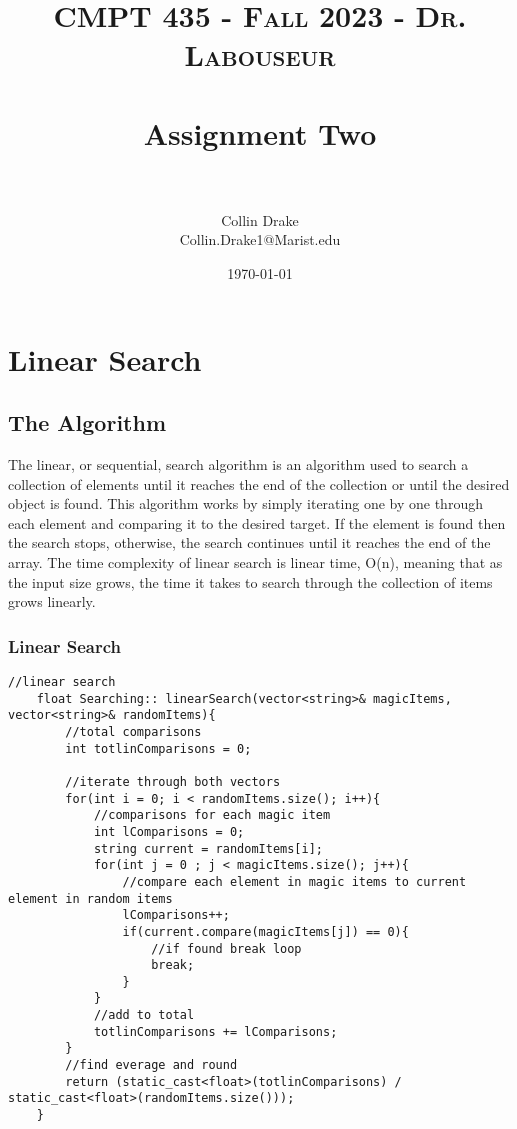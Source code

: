 \documentclass[letterpaper, 10pt,DIV=13]{scrartcl}
\title{	
   \normalfont \normalsize 
   \textsc{CMPT 435 - Fall 2023 - Dr. Labouseur} \\[10pt] %
   \horrule{0.5pt} \\[0.25cm] 	%
   \huge Assignment Two  \\     	    %
   \horrule{0.5pt} \\[0.25cm] 	%
}
\author{Collin Drake \\ \normalsize Collin.Drake1@Marist.edu}
\date{\normalsize\today} 	%
\numberwithin{equation}{section} %
\numberwithin{figure}{section} %
\numberwithin{table}{section} %
\begin{document}
\maketitle %

\section{Linear Search}

\subsection{The Algorithm}
The linear, or sequential, search algorithm is an algorithm used to search a collection of elements until it reaches the end of the collection or until the desired object is found. This algorithm works by simply iterating one by one through each element and comparing it to the desired target. If the element is found then the search stops, otherwise, the search continues until it reaches the end of the array. The time complexity of linear search is linear time, O(n), meaning that as the input size grows, the time it takes to search through the collection of items grows linearly.

\subsubsection*{Linear Search}
    \lstset{numbers=left, numberstyle=\tiny, stepnumber=1, numbersep=5pt, basicstyle=\footnotesize\ttfamily}
    \begin{lstlisting}[frame=single, ]
    //linear search
    float Searching:: linearSearch(vector<string>& magicItems, vector<string>& randomItems){
        //total comparisons
        int totlinComparisons = 0;
    
        //iterate through both vectors
        for(int i = 0; i < randomItems.size(); i++){
            //comparisons for each magic item
            int lComparisons = 0;
            string current = randomItems[i];
            for(int j = 0 ; j < magicItems.size(); j++){
                //compare each element in magic items to current element in random items
                lComparisons++;
                if(current.compare(magicItems[j]) == 0){
                    //if found break loop
                    break;
                }
            }
            //add to total
            totlinComparisons += lComparisons;
        }
        //find everage and round
        return (static_cast<float>(totlinComparisons) / static_cast<float>(randomItems.size()));
    }

\end{lstlisting}
\end{document}
